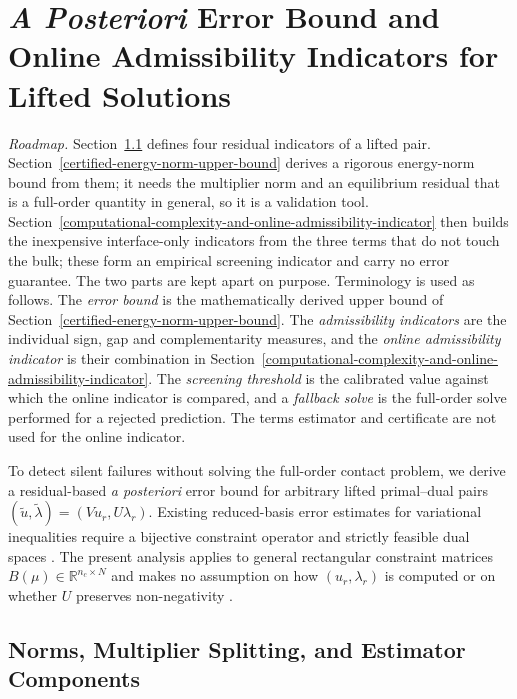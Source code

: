 \documentclass[11pt,a4paper]{article}
\begin{document}
\section{\emph{A Posteriori} Error Bound and Online Admissibility Indicators for Lifted Solutions}
\label{sec:estimator}

\emph{Roadmap.} Section~\ref{norms-multiplier-splitting-and-estimator-components} defines four residual indicators of a lifted pair. Section~\ref{certified-energy-norm-upper-bound} derives a rigorous energy-norm bound from them; it needs the multiplier norm and an equilibrium residual that is a full-order quantity in general, so it is a validation tool. Section~\ref{computational-complexity-and-online-admissibility-indicator} then builds the inexpensive interface-only indicators from the three terms that do not touch the bulk; these form an empirical screening indicator and carry no error guarantee. The two parts are kept apart on purpose. Terminology is used as follows. The \emph{error bound} is the mathematically derived upper bound of Section~\ref{certified-energy-norm-upper-bound}. The \emph{admissibility indicators} are the individual sign, gap and complementarity measures, and the \emph{online admissibility indicator} is their combination in Section~\ref{computational-complexity-and-online-admissibility-indicator}. The \emph{screening threshold} is the calibrated value against which the online indicator is compared, and a \emph{fallback solve} is the full-order solve performed for a rejected prediction. The terms estimator and certificate are not used for the online indicator.

To detect silent failures without solving the full-order contact problem, we derive a residual-based \emph{a posteriori} error bound for arbitrary lifted primal--dual pairs \((\tilde{u}, \tilde{\lambda}) = (V u_r, U \lambda_r)\). Existing reduced-basis error estimates for variational inequalities require a bijective constraint operator and strictly feasible dual spaces \cite{zhang2014duality}. The present analysis applies to general rectangular constraint matrices \(B(\mu) \in \mathbb{R}^{n_c \times N}\) and makes no assumption on how \((u_r, \lambda_r)\) is computed or on whether \(U\) preserves non-negativity \cite{banz2024generic, banz2026posteriori}.

\hypertarget{norms-multiplier-splitting-and-estimator-components}{%
\subsection{Norms, Multiplier Splitting, and Estimator Components}\label{norms-multiplier-splitting-and-estimator-components}}
\end{document}
